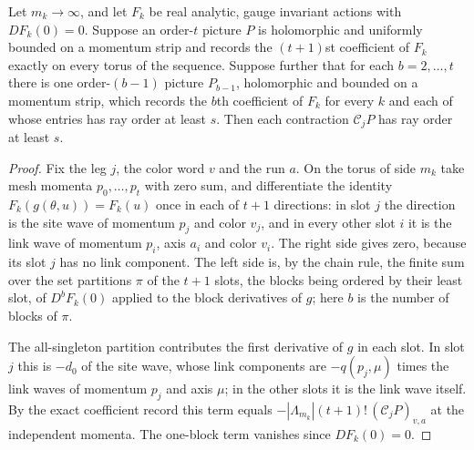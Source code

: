 \begin{lemma}
\label{lem:ex-ward-partition}
Let $m_k\to\infty$, and let $F_k$ be real analytic, gauge invariant
actions with $DF_k(0)=0$. Suppose an order-$t$ picture $P$ is
holomorphic and uniformly bounded on a momentum strip and records the
$(t+1)$st coefficient of $F_k$ exactly on every torus of the sequence.
Suppose further that for each $b=2,\ldots,t$ there is one order-$(b-1)$
picture $P_{b-1}$, holomorphic and bounded on a momentum strip, which
records the $b$th coefficient of $F_k$ for every $k$ and each of whose
entries has ray order at least $s$. Then each contraction
$\mathcal C_jP$ has ray order at least $s$.
\end{lemma}

\begin{proof}
Fix the leg $j$, the color word $v$ and the run $a$. On the torus of
side $m_k$ take mesh momenta $p_0,\ldots,p_t$ with zero sum, and
differentiate the identity $F_k(g(\theta,u))=F_k(u)$ once in each of
$t+1$ directions: in slot $j$ the direction is the site wave of momentum
$p_j$ and color $v_j$, and in every other slot $i$ it is the link wave
of momentum $p_i$, axis $a_i$ and color $v_i$. The right side gives
zero, because its slot $j$ has no link component. The left side is,
by the chain rule, the finite sum over the set partitions $\pi$ of the
$t+1$ slots, the blocks being ordered by their least slot, of
$D^{b}F_k(0)$ applied to the block derivatives of $g$; here $b$ is the
number of blocks of $\pi$.

The all-singleton partition contributes the first derivative of $g$ in
each slot. In slot $j$ this is $-d_0$ of the site wave, whose link
components are $-q(p_j,\mu)$ times the link waves of momentum $p_j$ and
axis $\mu$; in the other slots it is the link wave itself. By the exact
coefficient record this term equals
$-|\Lambda_{m_k}|(t+1)!\,(\mathcal C_jP)_{v,a}$ at the independent
momenta. The one-block term vanishes since $DF_k(0)=0$.


\end{proof}
